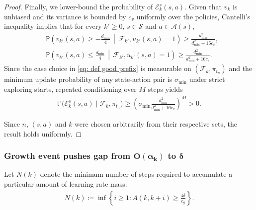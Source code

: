 \begin{proof}
Finally, we lower-bound the probability of $\mathcal E^s_k(s,a)$.
Given that $v_k$ is unbiased and its variance is bounded by $c_v$ uniformly over the policies,
Cantelli's inequality implies that for every $k' \ge 0$, $s \in \mathcal S$ and $a \in \mathcal A(s)$,
\begin{align}
&\mathbb P \! \left( v_{k'}(s,a) \ge -\frac{d_{\min}}{4} \,\middle|\, \mathcal F_{k'}, u_{k'}(s,a)=1 \right) \ge \frac{d_{\min}^2}{d_{\min}^2 + 16 c_v},
\label{eq:noise-lower}
\\
&\mathbb P \! \left( v_{k'}(s,a) \le \frac{d_{\min}}{4} \,\middle|\, \mathcal F_{k'}, u_{k'}(s,a)=1 \right) \ge \frac{d_{\min}^2}{d_{\min}^2 + 16 c_v}.
\label{eq:noise-upper}
\end{align}
Since the case choice in \eqref{eq: def good prefix} is measurable on $(\mathcal F_{k}, \pi_{t_n})$ and the minimum update probability of any state-action pair is $\sigma_{\min}$ under strict exploring starts, 
repeated conditioning over $M$ steps yields
\begin{align}
\label{eq: prob of good prefix}
\mathbb P \big( \mathcal E^s_k(s,a) \mid \mathcal F_{k} , \pi_{t_n} \big) \ge \left( \sigma_{\min} \frac{d_{\min}^2}{d_{\min}^2 + 16 c_v} \right)^M > 0 .
\end{align}

Since $n$, $(s,a)$ and $k$ were chosen arbitrarily from their respective sets, the result holds uniformly.
\end{proof}

\subsubsection{Growth event pushes gap from $\bm{O(\alpha_k)}$ to $\bm{\delta}$}

Let $N(k)$ denote the minimum number of steps required to accumulate a particular amount of learning rate mass:
\begin{align}
N(k) 
\coloneqq
\inf \left\{ i \ge 1 : 
A(k,k+i)
\ge \frac{4 \delta}{c_g} \right\} .
\end{align}

